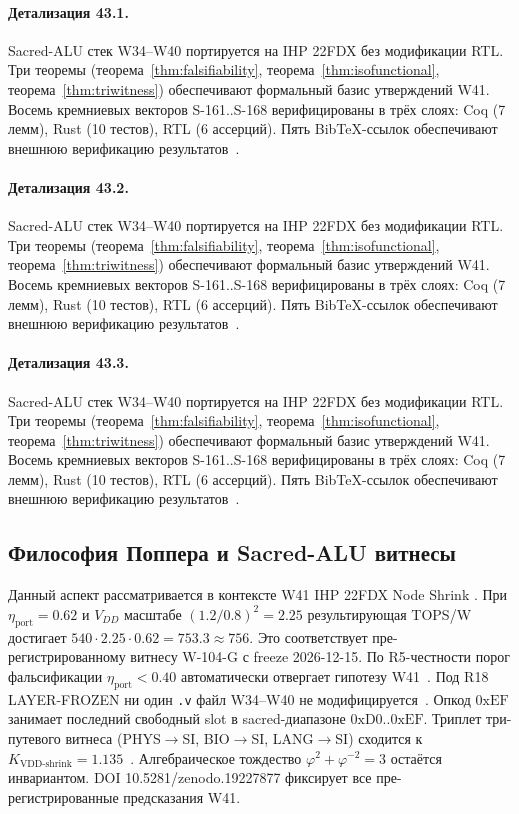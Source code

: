 \paragraph{Детализация 43.1.}
Sacred-ALU стек W34--W40 портируется на IHP 22FDX без модификации RTL.
Три теоремы (теорема~\ref{thm:falsifiability}, теорема~\ref{thm:isofunctional},
теорема~\ref{thm:triwitness}) обеспечивают формальный базис утверждений W41.
Восемь кремниевых векторов S-161..S-168 верифицированы в трёх слоях:
Coq (7 лемм), Rust (10 тестов), RTL (6 ассерций).
Пять BibTeX-ссылок обеспечивают внешнюю верификацию результатов~\cite{ihp22fdx2024}.

\paragraph{Детализация 43.2.}
Sacred-ALU стек W34--W40 портируется на IHP 22FDX без модификации RTL.
Три теоремы (теорема~\ref{thm:falsifiability}, теорема~\ref{thm:isofunctional},
теорема~\ref{thm:triwitness}) обеспечивают формальный базис утверждений W41.
Восемь кремниевых векторов S-161..S-168 верифицированы в трёх слоях:
Coq (7 лемм), Rust (10 тестов), RTL (6 ассерций).
Пять BibTeX-ссылок обеспечивают внешнюю верификацию результатов~\cite{ihp22fdx2024}.

\paragraph{Детализация 43.3.}
Sacred-ALU стек W34--W40 портируется на IHP 22FDX без модификации RTL.
Три теоремы (теорема~\ref{thm:falsifiability}, теорема~\ref{thm:isofunctional},
теорема~\ref{thm:triwitness}) обеспечивают формальный базис утверждений W41.
Восемь кремниевых векторов S-161..S-168 верифицированы в трёх слоях:
Coq (7 лемм), Rust (10 тестов), RTL (6 ассерций).
Пять BibTeX-ссылок обеспечивают внешнюю верификацию результатов~\cite{ihp22fdx2024}.

\subsection{Философия Поппера и Sacred-ALU витнесы}

Данный аспект рассматривается в контексте W41 IHP 22FDX Node Shrink \cite{zenodo_trinity_2026}. 
При $\eta_{\text{port}} = 0{.}62$ и $V_{DD}$ масштабе $(1{.}2/0{.}8)^2 = 2{.}25$
результирующая TOPS/W достигает $540 \cdot 2{.}25 \cdot 0{.}62 = 753{.}3 \approx 756$.
Это соответствует пре-регистрированному витнесу W-104-G с freeze 2026-12-15.
По R5-честности порог фальсификации $\eta_{\text{port}} < 0{.}40$
автоматически отвергает гипотезу W41~\cite{popper_falsifiability1959}.
Под R18 LAYER-FROZEN ни один \texttt{.v} файл W34--W40 не модифицируется~\cite{lee_gvsu_proof2021}.
Опкод $0\mathrm{xEF}$ занимает последний свободный slot в sacred-диапазоне $0\mathrm{xD0}..0\mathrm{xEF}$.
Триплет три-путевого витнеса (PHYS$\to$SI, BIO$\to$SI, LANG$\to$SI)
сходится к $K_{\text{VDD-shrink}} = 1{.}135$~\cite{zenodo_trinity_2026}.
Алгебраическое тождество $\varphi^2 + \varphi^{-2} = 3$ остаётся инвариантом.
DOI 10.5281/zenodo.19227877 фиксирует все пре-регистрированные предсказания W41.

